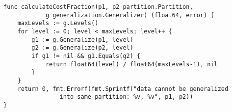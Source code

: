 \begin{lstlisting}[caption=Generalization cost calculation,label=lst:cost_calculation,float,floatplacement=H]
func calculateCostFraction(p1, p2 partition.Partition,
            g generalization.Generalizer) (float64, error) {
    maxLevels := g.Levels()
    for level := 0; level < maxLevels; level++ {
        g1 := g.Generalize(p1, level)
        g2 := g.Generalize(p2, level)
        if g1 != nil && g1.Equals(g2) {
            return float64(level) / float64(maxLevels-1), nil
        }
    }
    return 0, fmt.Errorf(fmt.Sprintf("data cannot be generalized
                into same partition: %v, %v", p1, p2))
}
\end{lstlisting}